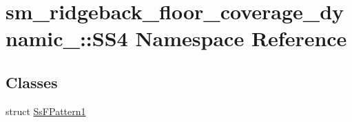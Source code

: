 \hypertarget{namespacesm__ridgeback__floor__coverage__dynamic__1_1_1SS4}{}\section{sm\+\_\+ridgeback\+\_\+floor\+\_\+coverage\+\_\+dynamic\+\_\+:\+:S\+S4 Namespace Reference}
\label{namespacesm__ridgeback__floor__coverage__dynamic__1_1_1SS4}
\subsection*{Classes}
\begin{DoxyCompactItemize}
\item 
struct \hyperlink{structsm__ridgeback__floor__coverage__dynamic__1_1_1SS4_1_1SsFPattern1}{Ss\+F\+Pattern1}
\end{DoxyCompactItemize}
